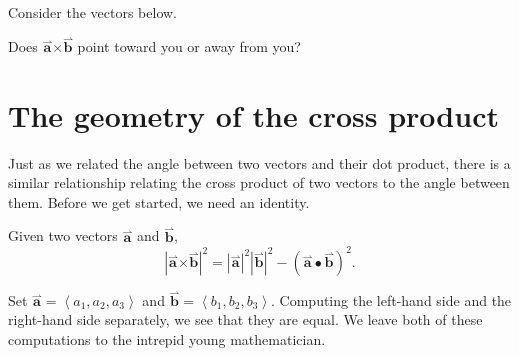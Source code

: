 \documentclass{ximera}
\begin{document}
\begin{question}
  Consider the vectors below.
  \begin{image}
  \end{image}
  Does $\overset{\boldsymbol{\rightharpoonup}}{\mathbf{a}} \boldsymbol\times \overset{\boldsymbol{\rightharpoonup}}{\mathbf{b}}$ point toward you or away from you?
  \begin{prompt}
    \begin{multipleChoice}
    \end{multipleChoice}
  \end{prompt}
\end{question}


\section{The geometry of the cross product}

Just as we related the angle between two vectors and their dot
product, there is a similar relationship relating the cross product of
two vectors to the angle between them. Before we get started, we need
an identity.

\begin{theorem}
  Given two vectors $\overset{\boldsymbol{\rightharpoonup}}{\mathbf{a}}$ and $\overset{\boldsymbol{\rightharpoonup}}{\mathbf{b}}$,
  \[
  |\overset{\boldsymbol{\rightharpoonup}}{\mathbf{a}} \boldsymbol\times \overset{\boldsymbol{\rightharpoonup}}{\mathbf{b}}|^2 = |\overset{\boldsymbol{\rightharpoonup}}{\mathbf{a}}|^2 |\overset{\boldsymbol{\rightharpoonup}}{\mathbf{b}}|^2 - (\overset{\boldsymbol{\rightharpoonup}}{\mathbf{a}} \bullet \overset{\boldsymbol{\rightharpoonup}}{\mathbf{b}})^2.
  \]
  \begin{explanation}
    Set $\overset{\boldsymbol{\rightharpoonup}}{\mathbf{a}} = \left< a_1,a_2,a_3 \right>$ and
    $\overset{\boldsymbol{\rightharpoonup}}{\mathbf{b}} = \left< b_1,b_2,b_3 \right>$. Computing the left-hand side and
    the right-hand side separately, we see that they are equal. We
    leave both of these computations to the intrepid young
    mathematician.
  \end{explanation}
\end{theorem}
\end{document}
